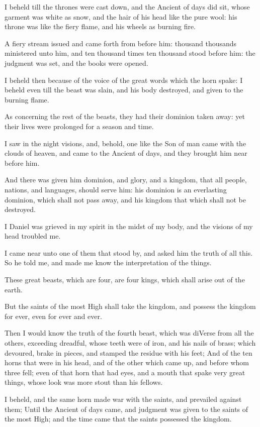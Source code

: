 \Verse I beheld till the thrones were cast down, and the Ancient of days did sit, whose garment was white as snow, and the hair of his head like the pure wool: his throne was like the fiery flame, and his wheels as burning fire.

\Verse A fiery stream issued and came forth from before him: thousand thousands ministered unto him, and ten thousand times ten thousand stood before him: the judgment was set, and the books were opened.

\Verse I beheld then because of the voice of the great words which the horn spake: I beheld even till the beast was slain, and his body destroyed, and given to the burning flame.

\Verse As concerning the rest of the beasts, they had their dominion taken away: yet their lives were prolonged for a season and time.

\Verse I saw in the night visions, and, behold, one like the Son of man came with the clouds of heaven, and came to the Ancient of days, and they brought him near before him.

\Verse And there was given him dominion, and glory, and a kingdom, that all people, nations, and languages, should serve him: his dominion is an everlasting dominion, which shall not pass away, and his kingdom that which shall not be destroyed.

\Verse I Daniel was grieved in my spirit in the midst of my body, and the visions of my head troubled me.

\Verse I came near unto one of them that stood by, and asked him the truth of all this. So he told me, and made me know the interpretation of the things.

\Verse These great beasts, which are four, are four kings, which shall arise out of the earth.

\Verse But the saints of the most High shall take the kingdom, and possess the kingdom for ever, even for ever and ever.

\Verse Then I would know the truth of the fourth beast, which was diVerse from all the others, exceeding dreadful, whose teeth were of iron, and his nails of brass; which devoured, brake in pieces, and stamped the residue with his feet; \Verse And of the ten horns that were in his head, and of the other which came up, and before whom three fell; even of that horn that had eyes, and a mouth that spake very great things, whose look was more stout than his fellows.

\Verse I beheld, and the same horn made war with the saints, and prevailed against them; \Verse Until the Ancient of days came, and judgment was given to the saints of the most High; and the time came that the saints possessed the kingdom.


